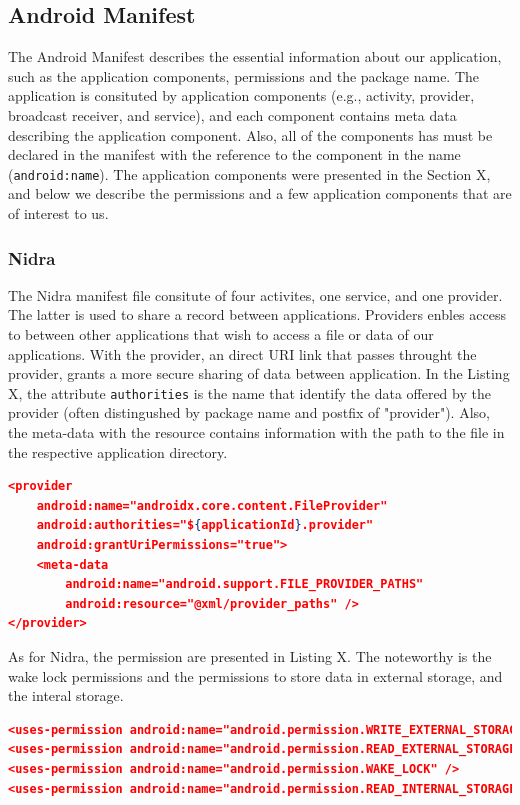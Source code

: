 \subsection{Android Manifest}
The Android Manifest describes the essential information about our application, such as the application components, permissions and the package name. The application is consituted by application components (e.g., activity, provider, broadcast receiver, and service), and each component contains meta data describing the application component. Also, all of the components has must be declared in the manifest with the reference to the component in the name  (\verb|android:name|). The application components were presented in the Section X, and below we describe the permissions and a few application components that are of interest to us.  

\subsubsection{Nidra}

The Nidra manifest file consitute of four activites, one service, and one provider. The latter is used to share a record between applications. Providers enbles access to between other applications that wish to access a file or data of our applications. With the provider, an direct URI link that passes throught the provider, grants a more secure sharing of data between application. In the Listing X, the attribute \verb|authorities| is the name that identify the data offered by the provider (often distingushed by package name and postfix of "provider"). Also, the meta-data with the resource contains information with the path to the file in the respective application directory. 

\begin{lstlisting}[language=json, caption={My Caption}, captionpos=b]
<provider
    android:name="androidx.core.content.FileProvider"
    android:authorities="${applicationId}.provider"
    android:grantUriPermissions="true">
    <meta-data
        android:name="android.support.FILE_PROVIDER_PATHS"
        android:resource="@xml/provider_paths" />
</provider>
\end{lstlisting}

As for Nidra, the permission are presented in Listing X. The noteworthy is the wake lock permissions and the permissions to store data in external storage, and the interal storage. 

\begin{lstlisting}[language=json, caption={My Caption}, captionpos=b]
<uses-permission android:name="android.permission.WRITE_EXTERNAL_STORAGE" />
<uses-permission android:name="android.permission.READ_EXTERNAL_STORAGE" />
<uses-permission android:name="android.permission.WAKE_LOCK" />
<uses-permission android:name="android.permission.READ_INTERNAL_STORAGE" />
\end{lstlisting}

